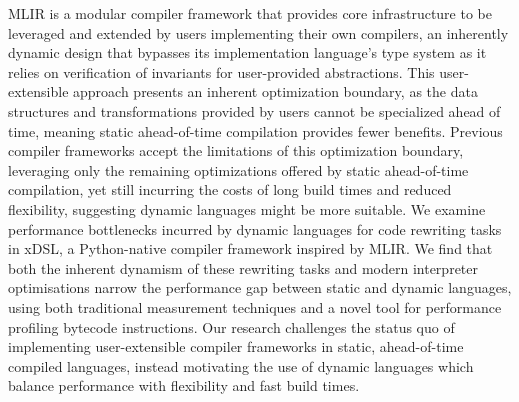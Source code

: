 MLIR is a modular compiler framework that provides core infrastructure to be leveraged and extended by users implementing their own compilers, an inherently dynamic design that bypasses its implementation language's type system as it relies on verification of invariants for user-provided abstractions.
This user-extensible approach presents an inherent optimization boundary, as the data structures and transformations provided by users cannot be specialized ahead of time, meaning static ahead-of-time compilation provides fewer benefits.
Previous compiler frameworks accept the limitations of this optimization boundary, leveraging only the remaining optimizations offered by static ahead-of-time compilation, yet still incurring the costs of long build times and reduced flexibility, suggesting dynamic languages might be more suitable.
We examine performance bottlenecks incurred by dynamic languages for code rewriting tasks in xDSL, a Python-native compiler framework inspired by MLIR.
We find that both the inherent dynamism of these rewriting tasks and modern interpreter optimisations narrow the performance gap between static and dynamic languages, using both traditional measurement techniques and a novel tool for performance profiling bytecode instructions.
Our research challenges the status quo of implementing user-extensible compiler frameworks in static, ahead-of-time compiled languages, instead motivating the use of dynamic languages which balance performance with flexibility and fast build times.


